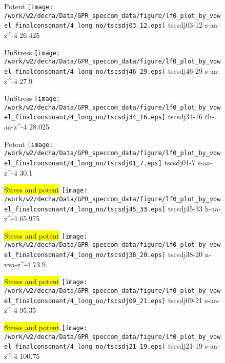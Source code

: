 \documentclass{article}
\begin{document}
\begin{figure}[t]
\begin{minipage}[b]{.24\textwidth}
\colorbox{Apricot}{Potent}
\centering
\texttt{[image: /work/w2/decha/Data/GPR\_speccom\_data/figure/lf0\_plot\_by\_vowel\_finalconsonant/4\_long\_no/tscsdj03\_12.eps]}
tscsdj03-12 s-aa-z\textasciicircum-4 26.425
\end{minipage}
\begin{minipage}[b]{.24\textwidth}
UnStress
\centering
\texttt{[image: /work/w2/decha/Data/GPR\_speccom\_data/figure/lf0\_plot\_by\_vowel\_finalconsonant/4\_long\_no/tscsdj46\_29.eps]}
tscsdj46-29 s-aa-z\textasciicircum-4 27.9
\end{minipage}
\begin{minipage}[b]{.24\textwidth}
UnStress
\centering
\texttt{[image: /work/w2/decha/Data/GPR\_speccom\_data/figure/lf0\_plot\_by\_vowel\_finalconsonant/4\_long\_no/tscsdj34\_16.eps]}
tscsdj34-16 th-aa-z\textasciicircum-4 28.025
\end{minipage}
\begin{minipage}[b]{.24\textwidth}
\colorbox{Apricot}{Potent}
\centering
\texttt{[image: /work/w2/decha/Data/GPR\_speccom\_data/figure/lf0\_plot\_by\_vowel\_finalconsonant/4\_long\_no/tscsdj01\_7.eps]}
tscsdj01-7 s-aa-z\textasciicircum-4 30.1
\end{minipage}
\end{figure}

\begin{figure}[t]
\begin{minipage}[b]{.24\textwidth}
\colorbox{yellow}{Stress and potent}
\centering
\texttt{[image: /work/w2/decha/Data/GPR\_speccom\_data/figure/lf0\_plot\_by\_vowel\_finalconsonant/4\_long\_no/tscsdj45\_33.eps]}
tscsdj45-33 h-aa-z\textasciicircum-4 65.975
\end{minipage}
\begin{minipage}[b]{.24\textwidth}
\colorbox{yellow}{Stress and potent}
\centering
\texttt{[image: /work/w2/decha/Data/GPR\_speccom\_data/figure/lf0\_plot\_by\_vowel\_finalconsonant/4\_long\_no/tscsdj38\_20.eps]}
tscsdj38-20 n-vva-z\textasciicircum-4 73.9
\end{minipage}
\begin{minipage}[b]{.24\textwidth}
\colorbox{yellow}{Stress and potent}
\centering
\texttt{[image: /work/w2/decha/Data/GPR\_speccom\_data/figure/lf0\_plot\_by\_vowel\_finalconsonant/4\_long\_no/tscsdj09\_21.eps]}
tscsdj09-21 s-aa-z\textasciicircum-4 95.35
\end{minipage}
\begin{minipage}[b]{.24\textwidth}
\colorbox{yellow}{Stress and potent}
\centering
\texttt{[image: /work/w2/decha/Data/GPR\_speccom\_data/figure/lf0\_plot\_by\_vowel\_finalconsonant/4\_long\_no/tscsdj21\_19.eps]}
tscsdj21-19 s-aa-z\textasciicircum-4 100.75
\end{minipage}
\end{figure}

\begin{figure}[t]
\end{figure}
\end{document}
